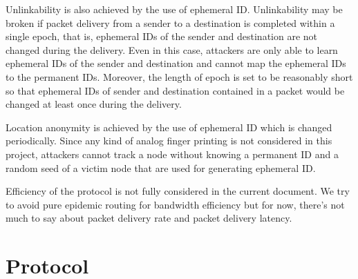 \documentclass[11pt]{article}
\begin{document}
Unlinkability is also achieved by the use of ephemeral ID.  Unlinkability may be broken if packet delivery from a sender to a destination is completed within a single epoch, that is, ephemeral IDs of the sender and destination are not changed during the delivery.  Even in this case, attackers are only able to learn ephemeral IDs of the sender and destination and cannot map the ephemeral IDs to the permanent IDs.  Moreover, the length of epoch is set to be reasonably short so that ephemeral IDs of sender and destination contained in a packet would be changed at least once during the delivery. 

Location anonymity is achieved by the use of ephemeral ID which is changed periodically.  Since any kind of analog finger printing is not considered in this project, attackers cannot track a node without knowing a permanent ID and a random seed of a victim node that are used for generating ephemeral ID. 

Efficiency of the protocol is not fully considered in the current document. We try to avoid pure epidemic routing for bandwidth efficiency but for now, there's not much to say about packet delivery rate and packet delivery latency. 



\section{Protocol}
\end{document}
